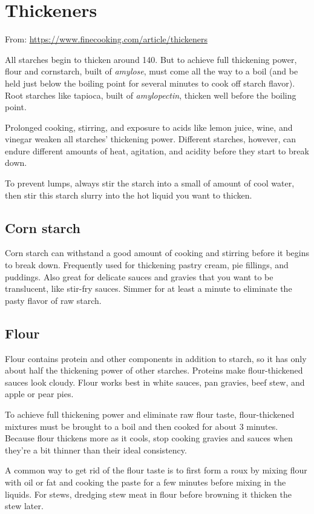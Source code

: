 
\section{Thickeners}
From: \url{https://www.finecooking.com/article/thickeners}

All starches begin to thicken around 140\degF. But to achieve full
thickening power, flour and cornstarch, built of \textsl{amylose}, must
come all the way to a boil (and be held just below the boiling point for
several minutes to cook off starch flavor). Root starches like tapioca,
built of \textsl{amylopectin}, thicken well before the boiling point.

Prolonged cooking, stirring, and exposure to acids like lemon juice, wine,
and vinegar weaken all starches' thickening power. Different starches,
however, can endure different amounts of heat, agitation, and acidity
before they start to break down.

To prevent lumps, always stir the starch into a small of amount of cool
water, then stir this starch slurry into the hot liquid you want to
thicken.

\subsection{Corn starch}
Corn starch can withstand a good amount of cooking and stirring before it
begins to break down. Frequently used for thickening pastry cream, pie
fillings, and puddings. Also great for delicate sauces and gravies that you
want to be translucent, like stir-fry sauces. Simmer for at least a minute
to eliminate the pasty flavor of raw starch.

\subsection{Flour}
Flour contains protein and other components in addition to starch, so it
has only about half the thickening power of other starches. Proteins make
flour-thickened sauces look cloudy. Flour works best in white sauces, pan
gravies, beef stew, and apple or pear pies.

To achieve full thickening power and eliminate raw flour taste,
flour-thickened mixtures must be brought to a boil and then cooked for
about 3 minutes. Because flour thickens more as it cools, stop cooking
gravies and sauces when they're a bit thinner than their ideal consistency.

A common way to get rid of the flour taste is to first form a roux by
mixing flour with oil or fat and cooking the paste for a few minutes before
mixing in the liquids. For stews, dredging stew meat in flour before
browning it thicken the stew later.

